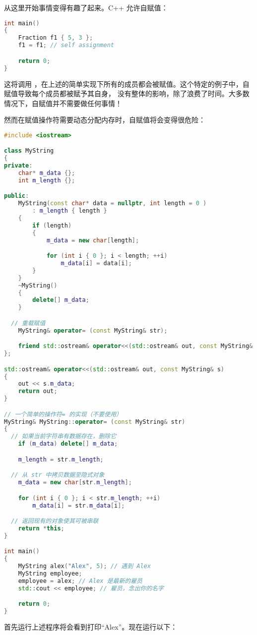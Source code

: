 \documentclass[../../LearnCpp.tex]{subfiles}
\begin{document}
从这里开始事情变得有趣了起来。C++ 允许自赋值：

\begin{lstlisting}[language=C++]
int main()
{
    Fraction f1 { 5, 3 };
    f1 = f1; // self assignment

    return 0;
}
\end{lstlisting}

这将调用 ，在上述的简单实现下所有的成员都会被赋值。这个特定的例子中，自赋值导致每个成员都被赋予其自身，
没有整体的影响，除了浪费了时间。大多数情况下，自赋值并不需要做任何事情！

然而在赋值操作符需要动态分配内存时，自赋值将会变得很危险：

\begin{lstlisting}[language=C++]
#include <iostream>

class MyString
{
private:
	char* m_data {};
	int m_length {};

public:
	MyString(const char* data = nullptr, int length = 0 )
		: m_length { length }
	{
		if (length)
		{
			m_data = new char[length];

			for (int i { 0 }; i < length; ++i)
				m_data[i] = data[i];
		}
	}
	~MyString()
	{
		delete[] m_data;
	}

  // 重载赋值
	MyString& operator= (const MyString& str);

	friend std::ostream& operator<<(std::ostream& out, const MyString& s);
};

std::ostream& operator<<(std::ostream& out, const MyString& s)
{
	out << s.m_data;
	return out;
}

// 一个简单的操作符= 的实现（不要使用）
MyString& MyString::operator= (const MyString& str)
{
  // 如果当前字符串有数据存在，删除它
	if (m_data) delete[] m_data;

	m_length = str.m_length;

  // 从 str 中拷贝数据至隐式对象
	m_data = new char[str.m_length];

	for (int i { 0 }; i < str.m_length; ++i)
		m_data[i] = str.m_data[i];

  // 返回现有的对象使其可被串联
	return *this;
}

int main()
{
	MyString alex("Alex", 5); // 遇到 Alex
	MyString employee;
	employee = alex; // Alex 是最新的雇员
	std::cout << employee; // 雇员，念出你的名字

	return 0;
}
\end{lstlisting}

首先运行上述程序将会看到打印“Alex”。现在运行以下：
\end{document}
